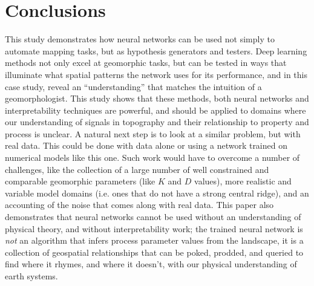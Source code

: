 \documentclass[draft]{agujournal2019}
\begin{document}
\section{Conclusions}
\label{sec:org47a994a}

This study demonstrates how neural networks can be used not simply to automate mapping tasks, but as hypothesis generators and testers. 
Deep learning methods not only excel at geomorphic tasks, but can be tested in ways that illuminate what spatial patterns the network uses for its performance, and in this case study, reveal an ``understanding'' that matches the intuition of a geomorphologist.   This study shows that these methods, both neural networks and interpretability techniques are powerful, and should be applied to domains where our understanding of signals in topography and their relationship to property and process is unclear.
A natural next step is to look at a similar problem, but with real data.  This could be done with data alone or using a network trained on numerical models like this one.  Such work would have to overcome a number of challenges, like the collection of a large number of well constrained and comparable geomorphic parameters (like \(K\) and \(D\) values), more realistic and variable model domains (i.e. ones that do not have a strong central ridge), and an accounting of the noise that comes along with real data.
This paper also demonstrates that neural networks cannot be used without an understanding of physical theory, and without interpretability work; the trained neural network is \emph{not} an algorithm that infers process parameter values from the landscape, it is a collection of geospatial relationships that can be poked, prodded, and queried to find where it rhymes, and where it doesn't, with our physical understanding of earth systems.




%
%
%
%
\appendix
\end{document}
